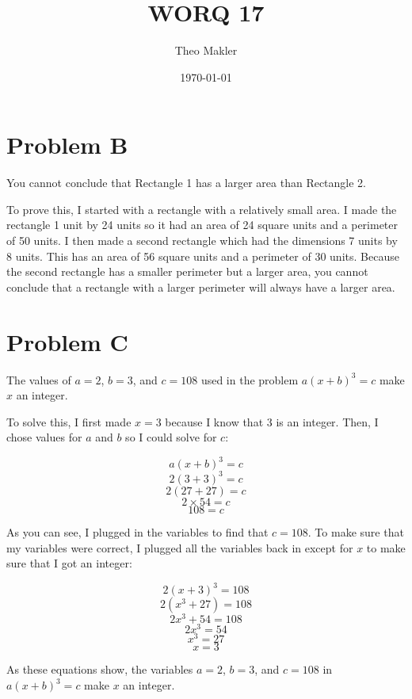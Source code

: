 \documentclass[a4paper]{article}
\title{WORQ 17}
\author{Theo Makler}
\date{\today}
\begin{document}
\maketitle

\section{Problem B}

You cannot conclude that Rectangle 1 has a larger area than Rectangle 2.

To prove this, I started with a rectangle with a relatively small area. I made the rectangle 1 unit by 24 units so it had an area of 24 square units and a perimeter of 50 units. I then made a second rectangle which had the dimensions 7 units by 8 units. This has an area of 56 square units and a perimeter of 30 units. Because the second rectangle has a smaller perimeter but a larger area, you cannot conclude that a rectangle with a larger perimeter will always have a larger area.

\section{Problem C}

The values of $a=2$, $b=3$, and $c=108$ used in the problem $a(x+b)^3=c$ make $x$ an integer.

To solve this, I first made $x=3$ because I know that 3 is an integer. Then, I chose values for $a$ and $b$ so I could solve for $c$:

$$a(x+b)^3=c$$
$$2(3+3)^3=c$$
$$2(27+27)=c$$
$$2\times54=c$$
$$108=c$$

As you can see, I plugged in the variables to find that $c=108$. To make sure that my variables were correct, I plugged all the variables back in except for $x$ to make sure that I got an integer:

$$2(x+3)^3=108$$
$$2(x^3+27)=108$$
$$2x^3+54=108$$
$$2x^3=54$$
$$x^3=27$$
$$x=3$$

As these equations show, the variables $a=2$, $b=3$, and $c=108$ in $a(x+b)^3=c$ make $x$ an integer.
\end{document}
